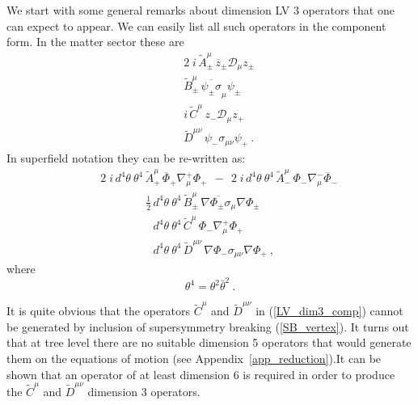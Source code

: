 \documentclass[12pt]{revtex4}
\begin{document}
We start with some general remarks about dimension LV 3 operators 
that one can expect to appear. 
We can easily list all such operators in the component form. In the matter sector these
are
\begin{eqnarray}
\nonumber
&& 2\;i\, \widetilde{A}_\pm^\mu\, \overline{z}_\pm 
\mathcal{D}_\mu z_\pm \\
\label{LV_dim3_comp}
&& \widetilde{B}_\pm^\mu\, \overline{\psi_\pm\sigma}_\mu 
      \psi_\pm \\
\nonumber
&& i\, \widetilde{C}^\mu\, z_- \mathcal{D}_\mu z_+ \\
\nonumber
&& \widetilde{D}^{\mu\nu}\, \psi_- \sigma_{\mu\nu} 
     \psi_+~.
\end{eqnarray}
In superfield notation they can be re-written as:
\begin{eqnarray}
\nonumber
&&
2\;i\,  d^4\theta~ \theta^4\, \widetilde{A}_+^\mu\, 
\overline{\Phi}_+ \nabla^+_\mu \Phi_+
~~-~~
2\;i\,  d^4\theta~ \theta^4\, \widetilde{A}_-^\mu\, \Phi_- 
                        \nabla^-_\mu 
    \overline{\Phi}_-  \\
\label{LV_dim3}
&&
\qquad
\qquad
\frac{1}{2}\,
 d^4\theta~ \theta^4\, \widetilde{B}_\pm^\mu\, 
\overline{\nabla \Phi_\pm \sigma_\mu} \nabla \Phi_\pm \\
\nonumber
&&
\qquad
\qquad
\phantom{\frac{1}{2}\,}
d^4\theta~ \theta^4\, \widetilde{C}^\mu\, 
\Phi_- \nabla_\mu^+ \Phi_+ \\
\nonumber 
&&
\qquad
\qquad
\phantom{\frac{1}{2}\,}
d^4\theta~ \theta^4\, \widetilde{D}^{\mu\nu}\,
\nabla \Phi_- \sigma_{\mu\nu} \nabla \Phi_+~, 
\end{eqnarray}
where
\[
\theta^4 = \theta^2 \bar\theta^2~.
\]

It is quite obvious that the operators $ \widetilde{C}^\mu $
and $ \widetilde{D}^{\mu\nu} $ in (\ref{LV_dim3_comp}) cannot
be generated by inclusion of supersymmetry breaking (\ref{SB_vertex}). 
It turns out that at tree level there are no suitable dimension 5 operators
that would generate them on the equations of motion
(see Appendix~\ref{app_reduction}).It can be shown that an operator 
    of at least dimension 6 is required 
in order to produce the $ \widetilde{C}^\mu $
and $ \widetilde{D}^{\mu\nu} $ dimension 3 operators.
\end{document}
